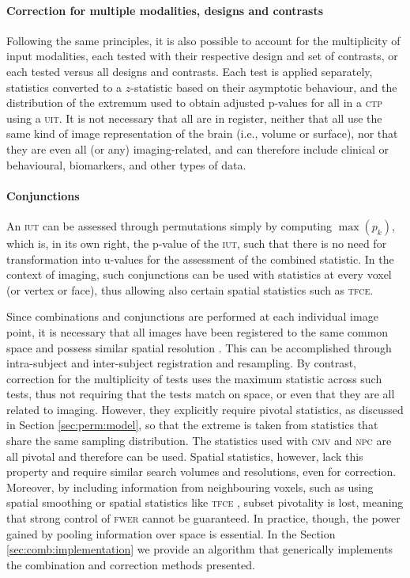 \paragraph{Correction for multiple modalities, designs and contrasts} Following the same principles, it is also possible to account for the multiplicity of input modalities, each tested with their respective design and set of contrasts, or each tested versus all designs and contrasts. Each test is applied separately, statistics converted to a $z$-statistic based on their asymptotic behaviour, and the distribution of the extremum used to obtain adjusted p-values for all in a \textsc{ctp} using a \textsc{uit}. It is not necessary that all are in register, neither that all use the same kind of image representation of the brain (i.e., volume or surface), nor that they are even all (or any) imaging-related, and can therefore include clinical or behavioural, biomarkers, and other types of data.

\paragraph{Conjunctions} An \textsc{iut} can be assessed through permutations simply by computing $\max \left(p_{k}\right)$, which is, in its own right, the p-value of the \textsc{iut}, such that there is no need for transformation into u-values for the assessment of the combined statistic. In the context of imaging, such conjunctions can be used with statistics at every voxel (or vertex or face), thus allowing also certain spatial statistics such as \textsc{tfce}.

\vspace{10pt}

Since combinations and conjunctions are performed at each individual image point, it is necessary that all images have been registered to the same common space and possess similar spatial resolution \citep{Lazar2002}. This can be accomplished through intra-subject and inter-subject registration and resampling. By contrast, correction for the multiplicity of tests uses the maximum statistic across such tests, thus not requiring that the tests match on space, or even that they are all related to imaging. However, they explicitly require pivotal statistics, as discussed in Section \ref{sec:perm:model}, so that the extreme is taken from statistics that share the same sampling distribution. The statistics used with \textsc{cmv} and \textsc{npc} are all pivotal and therefore can be used. Spatial statistics, however, lack this property and require similar search volumes and resolutions, even for correction. Moreover, by including information from neighbouring voxels, such as using spatial smoothing or spatial statistics like \textsc{tfce} \citep{Smith2009}, subset pivotality is lost, meaning that strong control of \textsc{fwer} cannot be guaranteed. In practice, though, the power gained by pooling information over space is essential. In the Section \ref{sec:comb:implementation} we provide an algorithm that generically implements the combination and correction methods presented.

